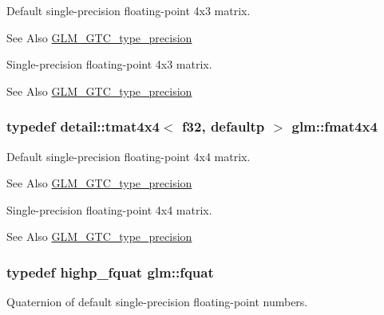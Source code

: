 Default single-\/precision floating-\/point 4x3 matrix. \begin{DoxySeeAlso}{See Also}
\hyperlink{group__gtc__type__precision}{G\-L\-M\-\_\-\-G\-T\-C\-\_\-type\-\_\-precision}
\end{DoxySeeAlso}
Single-\/precision floating-\/point 4x3 matrix. \begin{DoxySeeAlso}{See Also}
\hyperlink{group__gtc__type__precision}{G\-L\-M\-\_\-\-G\-T\-C\-\_\-type\-\_\-precision} 
\end{DoxySeeAlso}
\hypertarget{group__gtc__type__precision_gaa641dae0fcc277f028b4e48e16bbea86}{
\subsubsection[{fmat4x4}]{\setlength{\rightskip}{0pt plus 5cm}typedef detail\-::tmat4x4$<$ f32, defaultp $>$ {\bf glm\-::fmat4x4}}}\label{group__gtc__type__precision_gaa641dae0fcc277f028b4e48e16bbea86}
Default single-\/precision floating-\/point 4x4 matrix. \begin{DoxySeeAlso}{See Also}
\hyperlink{group__gtc__type__precision}{G\-L\-M\-\_\-\-G\-T\-C\-\_\-type\-\_\-precision}
\end{DoxySeeAlso}
Single-\/precision floating-\/point 4x4 matrix. \begin{DoxySeeAlso}{See Also}
\hyperlink{group__gtc__type__precision}{G\-L\-M\-\_\-\-G\-T\-C\-\_\-type\-\_\-precision} 
\end{DoxySeeAlso}
\hypertarget{group__gtc__type__precision_gaa95d73f08018f3864c6ae08dbf1c59f2}{
\subsubsection[{fquat}]{\setlength{\rightskip}{0pt plus 5cm}typedef highp\-\_\-fquat {\bf glm\-::fquat}}}\label{group__gtc__type__precision_gaa95d73f08018f3864c6ae08dbf1c59f2}
Quaternion of default single-\/precision floating-\/point numbers.

